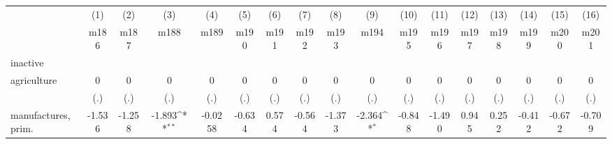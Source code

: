 {
\def\sym#1{\ifmmode^{#1}\else\(^{#1}\)\fi}
\begin{tabular}{l*{16}{c}}
\hline\hline
                    &\multicolumn{1}{c}{(1)}&\multicolumn{1}{c}{(2)}&\multicolumn{1}{c}{(3)}&\multicolumn{1}{c}{(4)}&\multicolumn{1}{c}{(5)}&\multicolumn{1}{c}{(6)}&\multicolumn{1}{c}{(7)}&\multicolumn{1}{c}{(8)}&\multicolumn{1}{c}{(9)}&\multicolumn{1}{c}{(10)}&\multicolumn{1}{c}{(11)}&\multicolumn{1}{c}{(12)}&\multicolumn{1}{c}{(13)}&\multicolumn{1}{c}{(14)}&\multicolumn{1}{c}{(15)}&\multicolumn{1}{c}{(16)}\\
                    &\multicolumn{1}{c}{m186}&\multicolumn{1}{c}{m187}&\multicolumn{1}{c}{m188}&\multicolumn{1}{c}{m189}&\multicolumn{1}{c}{m190}&\multicolumn{1}{c}{m191}&\multicolumn{1}{c}{m192}&\multicolumn{1}{c}{m193}&\multicolumn{1}{c}{m194}&\multicolumn{1}{c}{m195}&\multicolumn{1}{c}{m196}&\multicolumn{1}{c}{m197}&\multicolumn{1}{c}{m198}&\multicolumn{1}{c}{m199}&\multicolumn{1}{c}{m200}&\multicolumn{1}{c}{m201}\\
\hline
inactive            &                     &                     &                     &                     &                     &                     &                     &                     &                     &                     &                     &                     &                     &                     &                     &                     \\
agriculture         &           0         &           0         &           0         &           0         &           0         &           0         &           0         &           0         &           0         &           0         &           0         &           0         &           0         &           0         &           0         &           0         \\
                    &         (.)         &         (.)         &         (.)         &         (.)         &         (.)         &         (.)         &         (.)         &         (.)         &         (.)         &         (.)         &         (.)         &         (.)         &         (.)         &         (.)         &         (.)         &         (.)         \\
[1em]
manufactures, prim. &      -1.536         &      -1.258         &      -1.893\sym{**} &     -0.0258         &      -0.634         &       0.574         &      -0.564         &      -1.373         &      -2.364\sym{*}  &      -0.848         &      -1.490         &       0.945         &       0.252         &      -0.412         &      -0.672         &      -0.709         \\

\end{tabular}}
